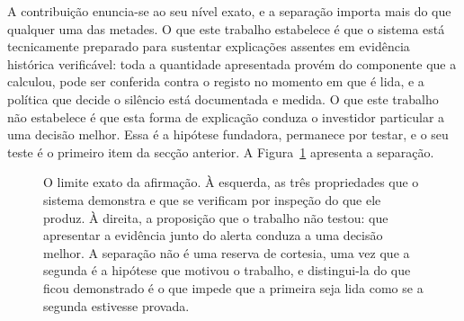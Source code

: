 A contribuição enuncia-se ao seu nível exato, e a separação importa mais do que qualquer uma das
metades. O que este trabalho estabelece é que o sistema está tecnicamente preparado para sustentar
explicações assentes em evidência histórica verificável: toda a quantidade apresentada provém do
componente que a calculou, pode ser conferida contra o registo no momento em que é lida, e a
política que decide o silêncio está documentada e medida. O que este trabalho não estabelece é que
esta forma de explicação conduza o investidor particular a uma decisão melhor. Essa é a hipótese
fundadora, permanece por testar, e o seu teste é o primeiro item da secção anterior.
A Figura~\ref{fig:con_fronteira} apresenta a separação.

\begin{figure}[!htbp]
\centering
{}
\caption[A fronteira daquilo que o trabalho estabelece]{O limite exato da afirmação. À esquerda,
as três propriedades que o sistema demonstra e que se verificam por inspeção do que ele produz. À
direita, a proposição que o trabalho não testou: que apresentar a evidência junto do alerta
conduza a uma decisão melhor. A separação não é uma reserva de cortesia, uma vez que a segunda é
a hipótese que motivou o trabalho, e distingui-la do que ficou demonstrado é o que impede que a
primeira seja lida como se a segunda estivesse provada.}
\label{fig:con_fronteira}
\end{figure}
